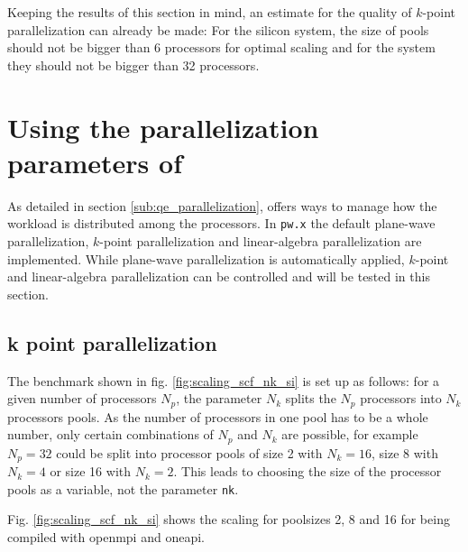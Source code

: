 \documentclass[main.tex]{subfiles}
\begin{document}
Keeping the results of this section in mind, an estimate for the quality of \(k\)-point parallelization can already be made:
For the silicon system, the size of pools should not be bigger than 6 processors for optimal scaling and for the \TaS system they should not be bigger than 32 processors.

\section{Using the parallelization parameters of \QE}\label{sec:scf_scaling_qe_parallelization}

As detailed in section \ref{sub:qe_parallelization}, \QE offers ways to manage how the workload is distributed among the processors.
In \texttt{pw.x} the default plane-wave parallelization, \(k\)-point parallelization and linear-algebra parallelization are implemented.
While plane-wave parallelization is automatically applied, \(k\)-point and linear-algebra parallelization can be controlled and will be tested in this section.

\subsection{k point parallelization}\label{sub:scf_scaling_k_point}

The benchmark shown in fig. \ref{fig:scaling_scf_nk_si} is set up as follows: for a given number of processors \(N_p\), the parameter \(N_k\) splits the \(N_p\) processors into \(N_k\) processors pools.
As the number of processors in one pool has to be a whole number, only certain combinations of \(N_p\) and \(N_k\) are possible, for example \(N_p = 32\) could be split into processor pools of size 2 with \(N_k = 16\), size 8 with \(N_k = 4\) or size 16 with \(N_k = 2\).
This leads to choosing the size of the processor pools as a variable, not the parameter \texttt{nk}.

Fig. \ref{fig:scaling_scf_nk_si} shows the scaling for poolsizes 2, 8 and 16 for \QE being compiled with \gls{openmpi} and \gls{oneapi}.
\end{document}
